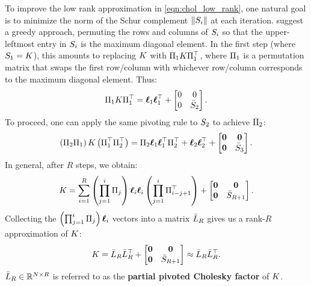To improve the low rank approximation in \cref{eqn:chol_low_rank}, one natural goal is to minimize the norm of the Schur complement $\Vert S_{i} \Vert$ at each iteration.
\citet{harbrecht2012low} suggest a greedy approach, permuting the rows and columns of $S_{i}$ so that the upper-leftmost entry in $S_{i}$ is the maximum diagonal element.
In the first step (where $S_1 = K$), this amounts to replacing $K$ with $\Pi_{1} K \Pi_{1}^\top$, where $\Pi_{1}$ is a permutation matrix that swaps the first row/column with whichever row/column corresponds to the maximum diagonal element.
Thus:
%
\begin{align*}
  \Pi_{1} K \Pi_{1}^\top = \boldsymbol{\ell}_{1}\boldsymbol{\ell}_{1}^{\top} + \begin{bmatrix} 0 & 0 \\ 0 & \bar {S}_2 \end{bmatrix}.
\end{align*}
%
To proceed, one can apply the same pivoting rule to $S_2$ to achieve $\Pi_{2}$:
%
\begin{align*}
  \left( \Pi_{2} \Pi_{1} \right) K \left( \Pi_{1}^\top \Pi_{2}^\top \right) = \Pi_{2} \boldsymbol{\ell}_{1}\boldsymbol{\ell}_{1}^{\top} \Pi_2^\top
  + \boldsymbol{\ell}_2 \boldsymbol{\ell}_2^\top + \begin{bmatrix} \mathbf{0} & \mathbf{0} \\ \mathbf{0} & \bar {S}_3 \end{bmatrix}.
\end{align*}
%
In general, after $R$ steps, we obtain:
\begin{align}
  K = \sum_{i=1}^{R} \left( \prod_{j=1}^i \Pi_j \right) {\boldsymbol{\ell}}_{i} {\boldsymbol{\ell}}_{i} \left( \prod_{j=1}^i \Pi_{i-j+1}^\top \right)
  + \begin{bmatrix} \mathbf{0} & \mathbf{0} \\ \mathbf{0} & \bar {S}_{R+1} \end{bmatrix}.
\end{align}
Collecting the $\left( \prod_{j=1}^i \Pi_j \right) {\boldsymbol{\ell}}_{i}$ vectors into a matrix $\bar{L}_R$ gives us a rank-$R$ approximation of $K$:
%
\begin{equation}
  K = \bar{L}_{R} \bar{L}_{R}^{\top} + \begin{bmatrix} \mathbf{0} & \mathbf{0} \\ \mathbf{0} & \bar {S}_{R+1} \end{bmatrix} \approx \bar{L}_{R} \bar{L}_{R}^{\top}.
  \label{eqn:chol_error}
\end{equation}
%
$\bar{L}_{R} \in \mathbb{R}^{N \times R}$ is referred to as the {\bf partial pivoted Cholesky factor} of $K$.


